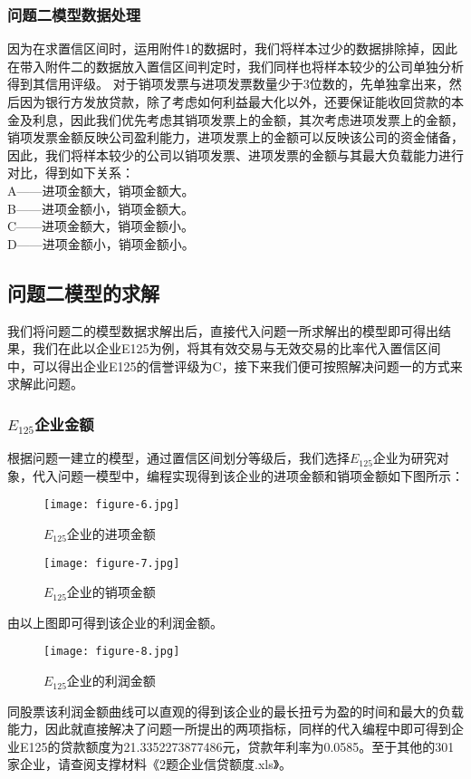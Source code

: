 \documentclass[dvipsnames,withoutpreface,bwprint]{cumcmthesis}
\begin{document}
\subsubsection{问题二模型数据处理}
因为在求置信区间时，运用附件1的数据时，我们将样本过少的数据排除掉，因此在带入附件二的数据放入置信区间判定时，我们同样也将样本较少的公司单独分析得到其信用评级。
对于销项发票与进项发票数量少于3位数的，先单独拿出来，然后因为银行方发放贷款，除了考虑如何利益最大化以外，还要保证能收回贷款的本金及利息，因此我们优先考虑其销项发票上的金额，其次考虑进项发票上的金额，销项发票金额反映公司盈利能力，进项发票上的金额可以反映该公司的资金储备，因此，我们将样本较少的公司以销项发票、进项发票的金额与其最大负载能力进行对比，得到如下关系：\\
\indent A——进项金额大，销项金额大。\\
\indent B——进项金额小，销项金额大。\\
\indent C——进项金额大，销项金额小。\\
\indent D——进项金额小，销项金额小。
\subsection{问题二模型的求解}
我们将问题二的模型数据求解出后，直接代入问题一所求解出的模型即可得出结果，我们在此以企业E125为例，将其有效交易与无效交易的比率代入置信区间中，可以得出企业E125的信誉评级为C，接下来我们便可按照解决问题一的方式来求解此问题。
\subsubsection{$E_{125}$企业金额}
根据问题一建立的模型，通过置信区间划分等级后，我们选择$E_{125}$企业为研究对象，代入问题一模型中，编程实现得到该企业的进项金额和销项金额如下图所示：
\begin{figure}[H]
    \centering
    \texttt{[image: figure-6.jpg]}
    \caption{$E_{125}$企业的进项金额}
    \label{fig:4}%
\end{figure}
\begin{figure}[H]
    \centering
    \texttt{[image: figure-7.jpg]}
    \caption{$E_{125}$企业的销项金额}
    \label{fig:5}%
\end{figure}
由以上图即可得到该企业的利润金额。
\begin{figure}[H]
    \centering
    \texttt{[image: figure-8.jpg]}
    \caption{$E_{125}$企业的利润金额}
    \label{fig:6}%
\end{figure}
同股票该利润金额曲线可以直观的得到该企业的最长扭亏为盈的时间和最大的负载能力，因此就直接解决了问题一所提出的两项指标，同样的代入编程中即可得到企业E125的贷款额度为21.3352273877486元，贷款年利率为0.0585。至于其他的301家企业，请查阅支撑材料《2题企业信贷额度.xls》。
\end{document}
